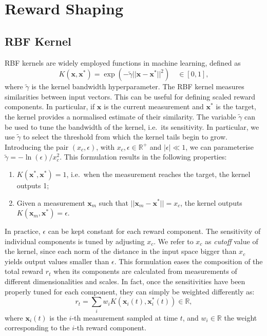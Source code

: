 \pagebreak
\section{Reward Shaping}
\label{sec:reward_shaping}

\subsection{RBF Kernel}

\ac{RBF} kernels are widely employed functions in machine learning, defined as
$$
K(\mathbf{x}, \mathbf{x}^*) = \exp \left( -\tilde\gamma ||\mathbf{x} - \mathbf{x}^*||^2  \right) \quad \in [0, 1] ,
$$
where $\tilde\gamma$ is the kernel bandwidth hyperparameter.
The \ac{RBF} kernel measures similarities between input vectors.
This can be useful for defining scaled reward components.
In particular, if $\mathbf{x}$ is the current measurement and $\mathbf{x}^*$ is the target, the kernel provides a normalised estimate of their similarity.
The variable $\tilde\gamma$ can be used to tune the bandwidth of the kernel, i.e.\ its sensitivity.
In particular, we use $\tilde\gamma$ to select the threshold from which the kernel tails begin to grow.
Introducing the pair $(x_c, \epsilon)$, with $x_c, \epsilon \in \mathbb{R}^+$ and $|\epsilon| \ll 1$, we can parameterise $\tilde\gamma = -\ln(\epsilon) / x_c^2$.
This formulation results in the following properties:

\begin{enumerate}
    \item $K(\mathbf{x}^*, \mathbf{x}^*) = 1$, i.e.\ when the measurement reaches the target, the kernel outputs 1;
    \item Given a measurement $\mathbf{x}_m$ such that $||\mathbf{x}_m - \mathbf{x}^*|| = x_c$, the kernel outputs $K(\mathbf{x}_m, \mathbf{x}^*) = \epsilon$.
\end{enumerate}

\noindent
In practice, $\epsilon$ can be kept constant for each reward component.
The sensitivity of individual components is tuned by adjusting $x_c$.
We refer to $x_c$ as \emph{cutoff} value of the kernel, since each norm of the distance in the input space bigger than $x_c$ yields output values smaller than $\epsilon$.
This formulation eases the composition of the total reward $r_t$ when its components are calculated from measurements of different dimensionalities and scales.
In fact, once the sensitivities have been properly tuned for each component, they can simply be weighted differently as:
%
\begin{equation}
    \label{eq:weighted_reward_kernel}
    r_t = \sum_i w_i K \left( \mathbf{x}_i(t), \mathbf{x}_i^*(t) \right) \in \mathbb{R}
    ,
\end{equation}
%
where $\mathbf{x}_{i}(t)$ is the $i$-th measurement sampled at time $t$, and $w_i \in \mathbb{R}$ the weight corresponding to the $i$-th reward component.


